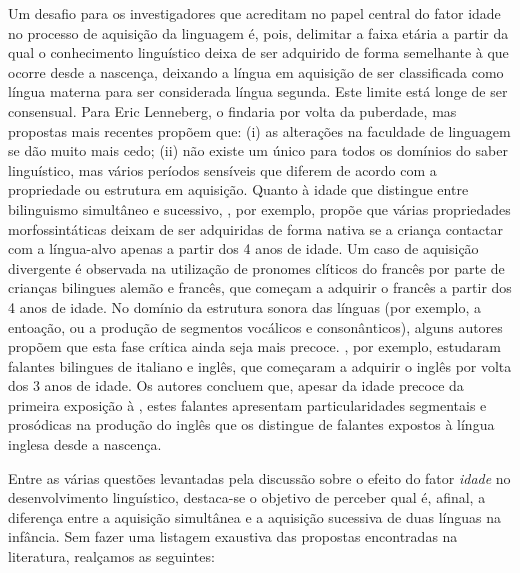 \documentclass[output=paper]{LSP/langsci}
\begin{document}
Um desafio para os investigadores que acreditam no papel central do fator idade no processo de aquisição da linguagem é, pois, delimitar a faixa etária a partir da qual o conhecimento linguístico deixa de ser adquirido de forma semelhante à que ocorre desde a nascença, deixando a língua em aquisição de ser classificada como língua materna para ser considerada língua segunda. Este limite está longe de ser consensual. Para Eric Lenneberg, o  findaria por volta da puberdade, mas propostas mais recentes propõem que: (i) as alterações na faculdade de linguagem se dão muito mais cedo; (ii) não existe um único  para todos os domínios do saber linguístico, mas vários períodos sensíveis que diferem de acordo com a propriedade ou estrutura em aquisição. Quanto à idade que distingue entre bilinguismo simultâneo e sucessivo, \cite{meisel2008}, por exemplo, propõe que várias propriedades morfossintáticas deixam de ser adquiridas de forma nativa se a criança contactar com a língua-alvo apenas a partir dos 4 anos de idade. Um caso de aquisição divergente é observada na utilização de pronomes clíticos do francês por parte de crianças bilingues alemão e francês, que começam a adquirir o francês a partir dos 4 anos de idade. No domínio da estrutura sonora das línguas (por exemplo, a entoação, ou a produção de segmentos vocálicos e consonânticos), alguns autores propõem que esta fase crítica ainda seja mais precoce. \cite{flege_etal1997}, por exemplo, estudaram falantes bilingues de italiano e inglês, que começaram a adquirir o inglês por volta dos 3 anos de idade. Os autores concluem que, apesar da idade precoce da primeira exposição à , estes falantes apresentam particularidades segmentais e prosódicas na produção do inglês que os distingue de falantes expostos à língua inglesa desde a nascença.

Entre as várias questões levantadas pela discussão sobre o efeito do fator \textit{idade} no desenvolvimento linguístico, destaca-se o objetivo de perceber qual é, afinal, a diferença entre a aquisição simultânea e a aquisição sucessiva de duas línguas na infância. Sem fazer uma listagem exaustiva das propostas encontradas na literatura, realçamos as seguintes:\largerpage
\end{document}

